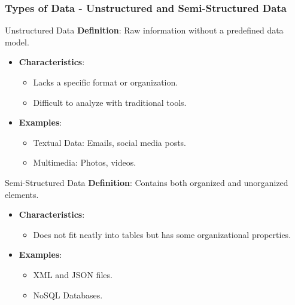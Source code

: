 \documentclass{beamer}
\begin{document}
\begin{frame}[fragile]
    \frametitle{Types of Data - Unstructured and Semi-Structured Data}
    \begin{block}{Unstructured Data}
        \textbf{Definition}: Raw information without a predefined data model.
    \end{block}
    \begin{itemize}
        \item \textbf{Characteristics}:
        \begin{itemize}
            \item Lacks a specific format or organization.
            \item Difficult to analyze with traditional tools.
        \end{itemize}
        \item \textbf{Examples}:
        \begin{itemize}
            \item Textual Data: Emails, social media posts.
            \item Multimedia: Photos, videos.
        \end{itemize}
    \end{itemize}

    \vspace{0.5cm}
    
    \begin{block}{Semi-Structured Data}
        \textbf{Definition}: Contains both organized and unorganized elements.
    \end{block}
    \begin{itemize}
        \item \textbf{Characteristics}:
        \begin{itemize}
            \item Does not fit neatly into tables but has some organizational properties.
        \end{itemize}
        \item \textbf{Examples}:
        \begin{itemize}
            \item XML and JSON files.
            \item NoSQL Databases.
        \end{itemize}
    \end{itemize}
\end{frame}
\end{document}
